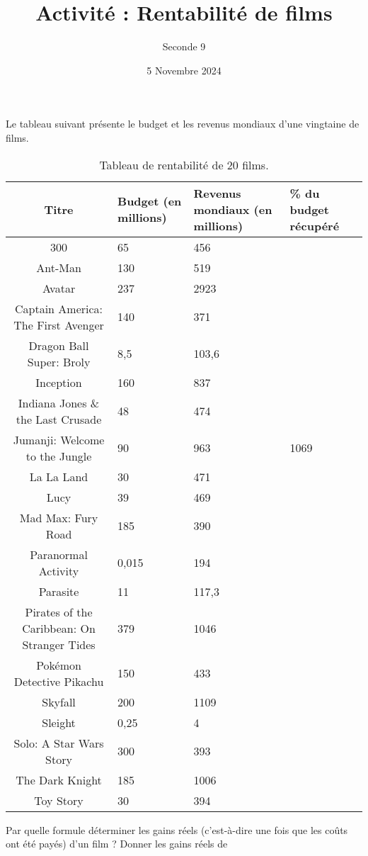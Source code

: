 \documentclass{article}
\title{Activité : Rentabilité de films}
\author{Seconde 9}
\date{5 Novembre 2024}
\begin{document}
\maketitle

Le tableau suivant présente le budget et les revenus mondiaux d'une vingtaine de films.
\begin{table}[h]
    \centering
    \begin{tabular}{|c|p{2cm}|p{2cm}|p{2cm}|}
    \hline
    Titre & Budget (en millions) & Revenus mondiaux (en millions) & \% du budget récupéré \\ \hline
    300 & 65 & 456 &  \\ \hline
    Ant-Man & 130 & 519 &  \\ \hline
    Avatar & 237 & 2923 & \\ \hline
    Captain America: The First Avenger & 140 & 371 & \\ \hline
    Dragon Ball Super: Broly & 8,5 & 103,6 & \\ \hline
    Inception & 160 & 837 & \\ \hline
    Indiana Jones \& the Last Crusade & 48 & 474 &  \\ \hline
    Jumanji: Welcome to the Jungle & 90 & 963 & 1069 \\ \hline
    La La Land & 30 & 471 & \\ \hline
    Lucy & 39 & 469 & \\ \hline
    Mad Max: Fury Road & 185 & 390 & \\ \hline
    Paranormal Activity & 0,015 & 194 & \\ \hline
    Parasite & 11 & 117,3 & \\ \hline
    Pirates of the Caribbean: On Stranger Tides & 379 & 1046 & \\ \hline
    Pokémon Detective Pikachu & 150 & 433 & \\ \hline
    Skyfall & 200 & 1109 & \\ \hline
    Sleight & 0,25 & 4 & \\ \hline
    Solo: A Star Wars Story & 300 & 393 & \\ \hline
    The Dark Knight & 185 & 1006 &  \\ \hline
    Toy Story & 30 & 394 &  \\ \hline
    \end{tabular}
    \caption{Tableau de rentabilité de 20 films.
    }
    \label{tab:my-table}
    \end{table}

\begin{enumquestions}
\item Par quelle formule déterminer les gains réels (c'est-à-dire une fois que les coûts ont été payés) d'un film ? Donner les gains réels de  
\end{enumquestions}
\end{document}
